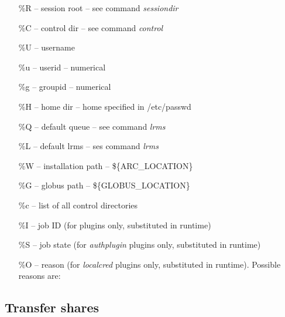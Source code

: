 \documentclass{article}                            %
\begin{document}
\begin{itemize}
\item [{\%R}] -- session root -- see command \emph{sessiondir}
\item [{\%C}] -- control dir -- see command \emph{control}
\item [{\%U}] -- username
\item [{\%u}] -- userid -- numerical
\item [{\%g}] -- groupid -- numerical
\item [{\%H}] -- home dir -- home specified in /etc/passwd
\item [{\%Q}] -- default queue -- see command \emph{lrms}
\item [{\%L}] -- default lrms -- ses command \emph{lrms}
\item [{\%W}] -- installation path -- \$\{ARC\_LOCATION\}
\item [{\%G}] -- globus path -- \$\{GLOBUS\_LOCATION\}
\item [{\%c}] -- list of all control directories
\item [{\%I}] -- job ID (for plugins only, substituted in runtime)
\item [{\%S}] -- job state (for \emph{authplugin} plugins only, substituted
in runtime)
\item [{\%O}] -- reason (for \emph{localcred} plugins only, substituted
in runtime). Possible reasons are:
\end{itemize}

\subsection{Transfer shares\label{sub:Transfershare}}
\end{document}

